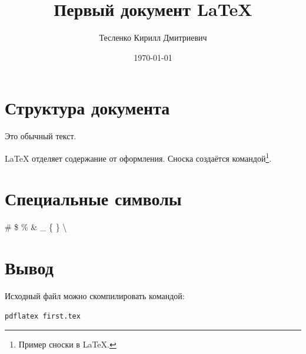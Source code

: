 \documentclass[a4paper,12pt]{article}
\title{Первый документ LaTeX}
\author{Тесленко Кирилл Дмитриевич}
\date{\today}
\begin{document}
\maketitle

\section{Структура документа}
Это обычный текст. %

LaTeX отделяет содержание от оформления.
Сноска создаётся командой\footnote{Пример сноски в LaTeX.}.

\section{Специальные символы}
\# \$ \% \& \_ \{ \} \textbackslash

\section{Вывод}
Исходный файл можно скомпилировать командой:
\begin{verbatim}
pdflatex first.tex
\end{verbatim}
\end{document}
